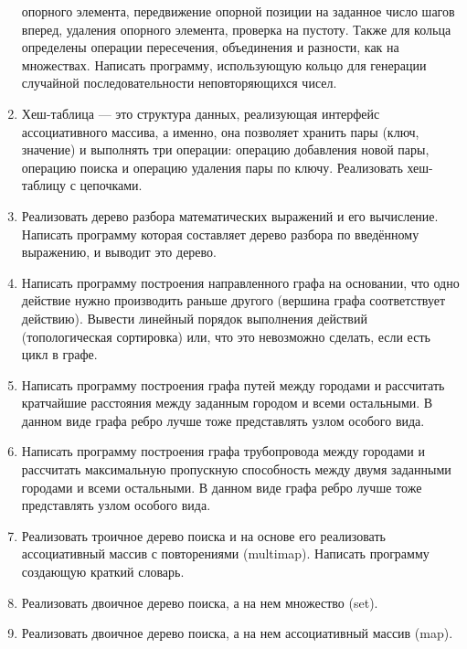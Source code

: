 \documentclass[12pt]{article}
\begin{document}
\begin{enumerate}
 опорного элемента, передвижение опорной позиции на заданное  число шагов вперед, удаления опорного элемента, проверка 
на пустоту. Также для кольца определены операции пересечения, объединения и разности, как на множествах. Написать 
программу, использующую кольцо для генерации случайной последовательности неповторяющихся чисел.
 \item Хеш-таблица --- это структура данных, реализующая интерфейс ассоциативного массива, а именно, она 
позволяет хранить пары (ключ, значение) и выполнять три операции: операцию добавления новой пары, операцию поиска и 
операцию удаления пары по ключу. Реализовать хеш-таблицу с цепочками. 
 \item Реализовать дерево разбора математических выражений и его вычисление. Написать программу которая составляет  
дерево разбора по введённому выражению, и выводит это дерево. 
 \item Написать программу построения направленного графа на основании, что одно действие нужно  производить раньше 
другого (вершина графа соответствует действию). Вывести линейный порядок выполнения действий (топологическая сортировка) 
или, что это невозможно сделать, если есть цикл в графе. 
 \item Написать программу построения графа путей между городами и рассчитать кратчайшие  расстояния между заданным 
городом и всеми остальными. В данном виде графа ребро лучше тоже представлять узлом особого вида.
 \item Написать программу построения графа трубопровода между городами и рассчитать  максимальную пропускную способность 
 между двумя заданными городами и всеми остальными. В данном виде графа ребро лучше тоже представлять узлом особого 
вида.
 \item Реализовать троичное дерево поиска и на основе его реализовать ассоциативный  массив с повторениями (multimap). 
Написать программу создающую краткий словарь.
 \item Реализовать двоичное дерево поиска, а на нем множество (set).
 \item Реализовать двоичное дерево поиска, а на нем ассоциативный массив (map).
 

\end{enumerate}
\end{document}
